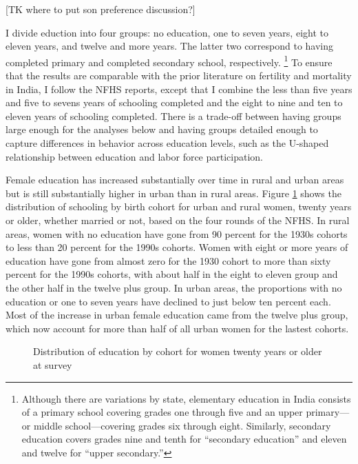 \documentclass[12pt,letterpaper]{article}
\begin{document}
[TK where to put son preference discussion?]

I divide eduction into four groups: no education, one to seven years, eight to eleven 
years, and twelve and more years.
The latter two correspond to having completed primary and completed secondary school, 
respectively.%
\footnote{
Although there are variations by state, elementary education in India consists of a 
primary school covering grades one through five and an upper primary---or middle 
school---covering grades six through eight. 
Similarly, secondary education covers grades nine and tenth for ``secondary education'' 
and eleven and twelve for ``upper secondary.''
}
To ensure that the results are comparable with the prior literature on fertility
and mortality in India, I follow the NFHS reports, except that I combine the 
less than five years and five to sevens years of schooling completed and the eight to nine 
and ten to eleven years of schooling completed.
There is a trade-off between having groups large enough for the analyses below and having 
groups detailed enough to capture differences in behavior across education levels, such as 
the U-shaped relationship between education and labor force participation.


Female education has increased substantially over time in rural and urban areas but 
is still substantially higher in urban than in rural areas.
Figure \ref{fig:education_over_time} shows the distribution of schooling by birth 
cohort for urban and rural women, 
twenty years or older, whether married or not, based on the four rounds of the NFHS.
In rural areas, women with no education have gone from 90 percent for the 1930s cohorts to 
less than 20 percent for the 1990s cohorts.
Women with eight or more years of education have gone from almost zero for the 1930 cohort 
to more than sixty percent for the 1990s cohorts, with about half in the eight to eleven 
group and the other half in the twelve plus group.
In urban areas, the proportions with no education or one to seven years have declined 
to just below ten percent each.
Most of the increase in urban female education came from the twelve plus group, which 
now account for more than half of all urban women for the lastest cohorts.

\begin{figure}[htpb]
\centering
{} 
\caption{Distribution of education by cohort for women twenty years or older at survey}
\label{fig:education_over_time}
\end{figure}
\end{document}
